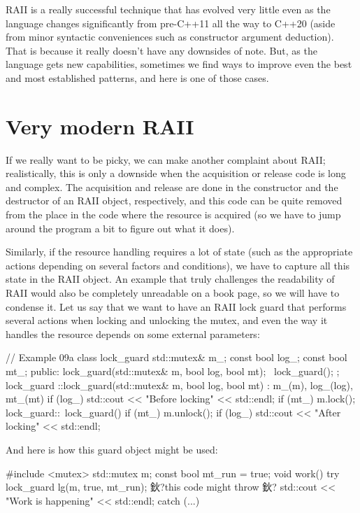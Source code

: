 RAII is a really successful technique that has evolved very little even as the language changes significantly from pre-C++11 all the way to C++20 (aside from minor syntactic conveniences such as constructor argument deduction). That is because it really doesn't have any downsides of note. But, as the language gets new capabilities, sometimes we find ways to improve even the best and most established patterns, and here is one of those cases.

\section{Very modern RAII}

If we really want to be picky, we can make another complaint about RAII; realistically, this is only a downside when the acquisition or release code is long and complex. The acquisition and release are done in the constructor and the destructor of an RAII object, respectively, and this code can be quite removed from the place in the code where the resource is acquired (so we have to jump around the program a bit to figure out what it does).

Similarly, if the resource handling requires a lot of state (such as the appropriate actions depending on several factors and conditions), we have to capture all this state in the RAII object. An example that truly challenges the readability of RAII would also be completely unreadable on a book page, so we will have to condense it. Let us say that we want to have an RAII lock guard that performs several actions when locking and unlocking the mutex, and even the way it handles the resource depends on some external parameters:

\begin{code}
// Example 09a
class lock_guard {
  std::mutex& m_;
  const bool log_;
  const bool mt_;
  public:
  lock_guard(std::mutex& m, bool log, bool mt);
  ~lock_guard();
};
lock_guard ::lock_guard(std::mutex& m, bool log, bool mt)
  : m_(m), log_(log), mt_(mt) {
  if (log_) std::cout << "Before locking" << std::endl;
  if (mt_) m.lock();
}
lock_guard::~lock_guard() {
  if (mt_) m.unlock();
  if (log_) std::cout << "After locking" << std::endl;
}
\end{code}

And here is how this guard object might be used:

\begin{code}
#include <mutex>
std::mutex m;
const bool mt_run = true;
void work() {
  try {
    lock_guard lg(m, true, mt_run);
    鈥?this code might throw 鈥?
    std::cout << "Work is happening" << std::endl;
  } catch (...) {}
}
\end{code}

